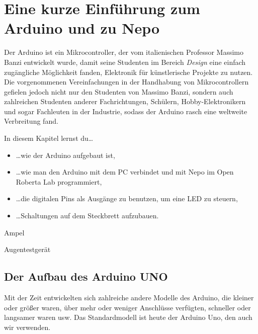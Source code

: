 \pagecolor{CadetBlue!70!green}
\chapter{Eine kurze Einführung zum Arduino und zu Nepo}
\label{kap:nepo}

Der Arduino ist ein Mikrocontroller, der vom italienischen Professor Massimo Banzi entwickelt wurde, damit seine Studenten im Bereich \emph{Design} eine einfach zugängliche Möglichkeit fanden, Elektronik für künstlerische Projekte zu nutzen. Die vorgenommenen Vereinfachungen in der Handhabung von Mikrocontrollern gefielen jedoch nicht nur den Studenten von Massimo Banzi, sondern auch zahlreichen Studenten anderer Fachrichtungen, Schülern, Hobby-Elektronikern und sogar Fachleuten in der Industrie, sodass der Arduino rasch eine weltweite Verbreitung fand.

\bigskip
In diesem Kapitel lernst du\dots
\begin{itemize}
	\item \dots wie der Arduino aufgebaut ist,
	\item \dots wie man den Arduino mit dem PC verbindet und mit Nepo im Open Roberta Lab programmiert,
	\item \dots die digitalen Pins als Ausgänge zu benutzen, um eine LED zu steuern,
	\item \dots Schaltungen auf dem Steckbrett aufzubauen.
\end{itemize}

\bigskip

\bigskip

\begin{projektueberblick}
	\item Ampel \dotfill \pageref{proj:ampel}
	\item Augentestgerät \dotfill\pageref{proj:augentest}
\end{projektueberblick}

\newpage
\nopagecolor
\section{Der Aufbau des Arduino UNO}
Mit der Zeit entwickelten sich zahlreiche andere Modelle des Arduino, die kleiner oder größer waren, über mehr oder weniger Anschlüsse verfügten, schneller oder langsamer waren usw. Das Standardmodell ist heute der Arduino Uno, den auch wir verwenden.

